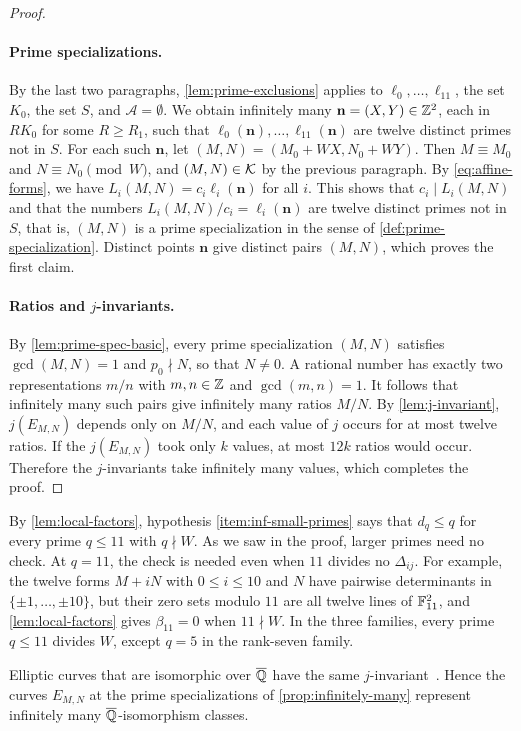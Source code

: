 \begin{proof}
\paragraph{Prime specializations.} By the last two paragraphs, \cref{lem:prime-exclusions} applies to $\ell_0,\dots,\ell_{11}$, the set $K_0$, the set $S$, and $\mathcal A=\emptyset$. We obtain infinitely many $\mathbf n=(X,Y)\in\mathbb Z^2$, each in $RK_0$ for some $R\ge R_1$, such that $\ell_0(\mathbf n),\dots,\ell_{11}(\mathbf n)$ are twelve distinct primes not in $S$. For each such $\mathbf n$, let $(M,N)=(M_0+WX,N_0+WY)$. Then $M\equiv M_0$ and $N\equiv N_0\pmod W$, and $(M,N)\in\mathcal K$ by the previous paragraph. By \eqref{eq:affine-forms}, we have $L_i(M,N)=c_i\ell_i(\mathbf n)$ for all $i$. This shows that $c_i\mid L_i(M,N)$ and that the numbers $L_i(M,N)/c_i=\ell_i(\mathbf n)$ are twelve distinct primes not in $S$, that is, $(M,N)$ is a prime specialization in the sense of \cref{def:prime-specialization}. Distinct points $\mathbf n$ give distinct pairs $(M,N)$, which proves the first claim.

\paragraph{Ratios and $j$-invariants.} By \cref{lem:prime-spec-basic}, every prime specialization $(M,N)$ satisfies $\gcd(M,N)=1$ and $p_0\nmid N$, so that $N\ne0$. A rational number has exactly two representations $m/n$ with $m,n\in\mathbb Z$ and $\gcd(m,n)=1$. It follows that infinitely many such pairs give infinitely many ratios $M/N$. By \cref{lem:j-invariant}, $j(E_{M,N})$ depends only on $M/N$, and each value of $j$ occurs for at most twelve ratios. If the $j(E_{M,N})$ took only $k$ values, at most $12k$ ratios would occur. Therefore the $j$-invariants take infinitely many values, which completes the proof.
\end{proof}

\begin{remark}\label{rem:primes-threshold}
By \cref{lem:local-factors}, hypothesis \ref{item:inf-small-primes} says that $d_q\le q$ for every prime $q\le11$ with $q\nmid W$. As we saw in the proof, larger primes need no check. At $q=11$, the check is needed even when $11$ divides no $\Delta_{ij}$. For example, the twelve forms $M+iN$ with $0\le i\le10$ and $N$ have pairwise determinants in $\{\pm1,\dots,\pm10\}$, but their zero sets modulo $11$ are all twelve lines of $\mathbb F_{11}^2$, and \cref{lem:local-factors} gives $\beta_{11}=0$ when $11\nmid W$. In the three families, every prime $q\le11$ divides $W$, except $q=5$ in the rank-seven family.
\end{remark}

\begin{remark}\label{rem:geometric-classes}
Elliptic curves that are isomorphic over $\overline{\mathbb Q}$ have the same $j$-invariant~\cite[Proposition~III.1.4(b)]{SilvermanAEC}. %
Hence the curves $E_{M,N}$ at the prime specializations of \cref{prop:infinitely-many} represent infinitely many $\overline{\mathbb Q}$-isomorphism classes.
\end{remark}

